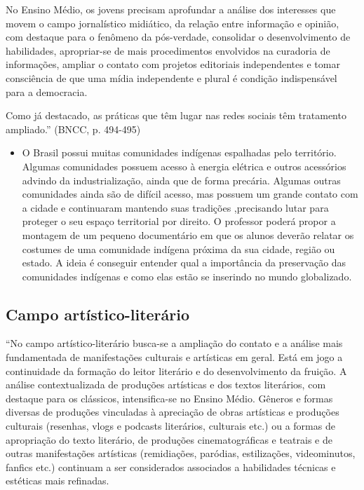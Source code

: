 \documentclass[12pt]{extarticle}
\begin{document}
No Ensino Médio, os jovens precisam aprofundar a análise dos interesses
que movem o campo jornalístico midiático, da relação entre informação e
opinião, com destaque para o fenômeno da pós-verdade, consolidar o
desenvolvimento de habilidades, apropriar-se de mais procedimentos
envolvidos na curadoria de informações, ampliar o contato com projetos
editoriais independentes e tomar consciência de que uma mídia
independente e plural é condição indispensável para a democracia.

Como já destacado, as práticas que têm lugar nas redes sociais têm
tratamento ampliado.'' (BNCC, p. 494-495)

\begin{itemize}
\item
  O Brasil possui muitas comunidades indígenas espalhadas pelo
  território. Algumas comunidades possuem acesso à energia elétrica e
  outros acessórios advindo da industrialização, ainda que de forma
  precária. Algumas outras comunidades ainda são de difícil acesso, mas
  possuem um grande contato com a cidade e continuaram mantendo suas
  tradições ,precisando lutar para proteger o seu espaço territorial por
  direito. O professor poderá propor a montagem de um pequeno
  documentário em que os alunos deverão relatar os costumes de uma
  comunidade indígena próxima da sua cidade, região ou estado. A ideia é
  conseguir entender qual a importância da preservação das comunidades
  indígenas e como elas estão se inserindo no mundo globalizado.
\end{itemize}

\subsection{Campo artístico-literário }

``No campo artístico-literário busca-se a ampliação do contato e a
análise mais fundamentada de manifestações culturais e artísticas em
geral. Está em jogo a continuidade da formação do leitor literário e do
desenvolvimento da fruição. A análise contextualizada de produções
artísticas e dos textos literários, com destaque para os clássicos,
intensifica-se no Ensino Médio. Gêneros e formas diversas de produções
vinculadas à apreciação de obras artísticas e produções culturais
(resenhas, vlogs e podcasts literários, culturais etc.) ou a formas de
apropriação do texto literário, de produções cinematográficas e teatrais
e de outras manifestações artísticas (remidiações, paródias,
estilizações, videominutos, fanfics etc.) continuam a ser considerados
associados a habilidades técnicas e estéticas mais refinadas.
\end{document}
